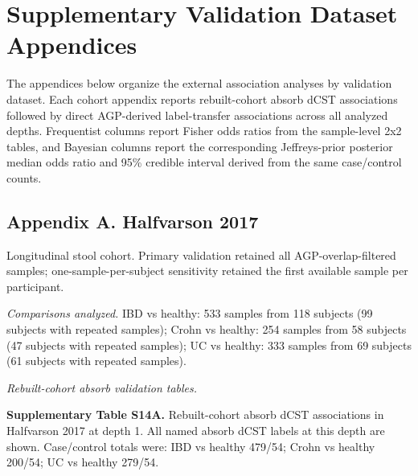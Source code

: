 \clearpage
\section*{Supplementary Validation Dataset Appendices}

The appendices below organize the external association analyses by validation dataset. Each cohort appendix reports rebuilt-cohort absorb dCST associations followed by direct AGP-derived label-transfer associations across all analyzed depths. Frequentist columns report Fisher odds ratios from the sample-level 2x2 tables, and Bayesian columns report the corresponding Jeffreys-prior posterior median odds ratio and 95\% credible interval derived from the same case/control counts.

\subsection*{Appendix A. Halfvarson 2017}
Longitudinal stool cohort. Primary validation retained all AGP-overlap-filtered samples; one-sample-per-subject sensitivity retained the first available sample per participant.

\noindent\textit{Comparisons analyzed.} IBD vs healthy: 533 samples from 118 subjects (99 subjects with repeated samples); Crohn vs healthy: 254 samples from 58 subjects (47 subjects with repeated samples); UC vs healthy: 333 samples from 69 subjects (61 subjects with repeated samples).

\noindent\textit{Rebuilt-cohort absorb validation tables.}

\noindent\textbf{Supplementary Table S14A.} Rebuilt-cohort absorb dCST associations in Halfvarson 2017 at depth 1. All named absorb dCST labels at this depth are shown. Case/control totals were: IBD vs healthy 479/54; Crohn vs healthy 200/54; UC vs healthy 279/54.

